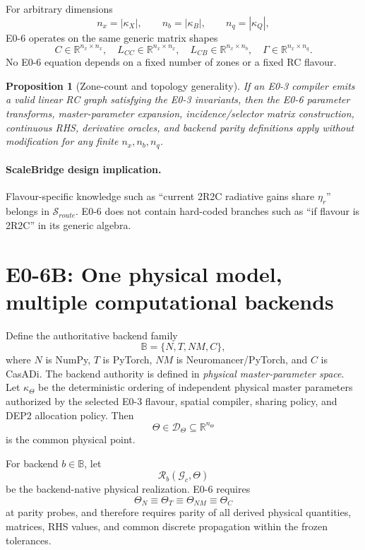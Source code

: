 \documentclass[11pt]{article}
\newcommand{\R}{\mathbb{R}}
\newtheorem{proposition}{Proposition}
\begin{document}
For arbitrary dimensions
\[
n_x=|\kappa_X|,\qquad n_b=|\kappa_B|,\qquad n_q=|\kappa_Q|,
\]
E0-6 operates on the same generic matrix shapes
\[
C\in\R^{n_x\times n_x},\quad
L_{CC}\in\R^{n_x\times n_x},\quad
L_{CB}\in\R^{n_x\times n_b},\quad
\Gamma\in\R^{n_x\times n_q}.
\]
No E0-6 equation depends on a fixed number of zones or a fixed RC flavour.

\begin{proposition}[Zone-count and topology generality]
If an E0-3 compiler emits a valid linear RC graph satisfying the E0-3
invariants, then the E0-6 parameter transforms, master-parameter expansion,
incidence/selector matrix construction, continuous RHS, derivative oracles, and
backend parity definitions apply without modification for any finite $n_x,n_b,n_q$.
\end{proposition}

\paragraph{ScaleBridge design implication.}
Flavour-specific knowledge such as ``current 2R2C radiative gains share
$\eta_r$'' belongs in $\mathcal S_{route}$. E0-6 does not contain hard-coded
branches such as ``if flavour is 2R2C'' in its generic algebra.

\section{E0-6B: One physical model, multiple computational backends}

Define the authoritative backend family
\[
\boxed{\mathbb B=\{N,T,NM,C\}},
\]
where $N$ is NumPy, $T$ is PyTorch, $NM$ is Neuromancer/PyTorch, and $C$ is
CasADi. The backend authority is defined in \emph{physical master-parameter
space}. Let $\kappa_\Theta$ be the deterministic ordering of independent
physical master parameters authorized by the selected E0-3 flavour, spatial
compiler, sharing policy, and DEP2 allocation policy. Then
\[
\boxed{\Theta\in\mathcal D_\Theta\subseteq\mathbb R^{n_\Theta}}
\]
is the common physical point.

For backend $b\in\mathbb B$, let
\[
\mathcal R_b(\mathcal G_c,\Theta)
\]
be the backend-native physical realization. E0-6 requires
\[
\boxed{
\Theta_N\equiv\Theta_T\equiv\Theta_{NM}\equiv\Theta_C
}
\]
at parity probes, and therefore requires parity of all derived physical
quantities, matrices, RHS values, and common discrete propagation within the
frozen tolerances.
\end{document}
